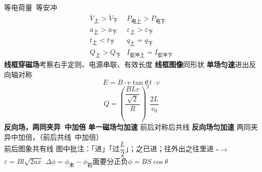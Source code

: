 等电荷量\ 等安冲
\[ \begin{array}{ll}
\overline{V}_{\text{上}}>\overline{V}_{\text{下}} & P_{\text{电上}}>P_{\text{电下}}\\
\overline{a}_{\text{上}}>\overline{a}_{\text{下}} & \varepsilon_{\text{上}}>\varepsilon_{\text{下}}\\
t_{\text{上}}<t_{\text{下}} & q_{\text{上}}=q_{\text{下}}\\
Q_{\text{上}}>Q_{\text{下}} & I_{\text{安冲上}}=I_{\text{安冲下}}
\end{array} \] %
\textbf{线框穿磁场}\quad 考察右手定则、电源串联、有效长度 %
\textbf{线框图像}\quad 同形状
\textbf{单场匀速}\quad 进出反向轴对称
\[ E=B\cdot v\tan\theta\,t\cdot v \]
\[ Q=\left(\frac{\dfrac{BLv}{\sqrt{2}}}{R}\right)^{2}\frac{2L}{v_0} \] %
\textbf{反向场，两同夹异\ 中加倍}
\textbf{单一磁场匀加速}
前后对称后共线
\textbf{反向场匀加速}
两同夹异中加倍，（前后共线\ 中加倍）\\
前后图象共有线
图中批注：「进」「过$\dfrac{L}{2}$」；之已进；往外出之往里进 %
$\square\to$\quad $\varepsilon=Bl\sqrt{2ax}$\quad {}
$\Delta\phi=\phi_{\text{末}}-\phi_{\text{初}}$\qquad 面要分正负\qquad $\phi=BS\cos\theta$

